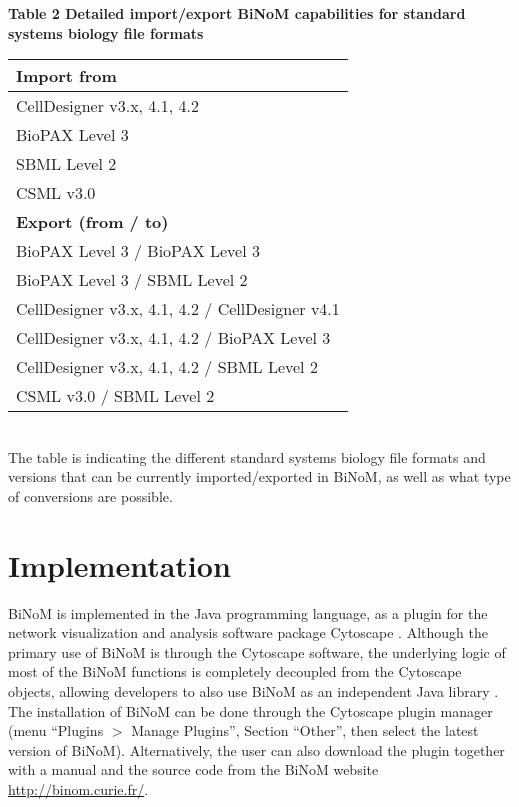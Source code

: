 \documentclass[11pt]{bmc_article_s50}
\newenvironment{bmcformat}{\begin{raggedright}\baselineskip20pt\sloppy\setboolean{publ}{false}}{\end{raggedright}\baselineskip20pt\sloppy}
\begin{document}
\begin{bmcformat}
\begin{sidewaystable}
\end{sidewaystable}


\begin{table}[!h]
  \textbf{Table 2 Detailed import/export BiNoM capabilities for standard systems biology file formats}

      \begin{tabular*}{\textwidth}{@{\extracolsep\fill}l}
        \hline
    \textbf{Import from} \\
    \hline
        CellDesigner v3.x, 4.1, 4.2 \\
        \hline
        BioPAX Level 3  \\
        \hline
        SBML Level 2 \\
        \hline
        CSML v3.0  \\
        \hline
        \textbf{Export (from / to)} \\
        \hline
        BioPAX Level 3 / BioPAX Level 3 \\
        \hline
        BioPAX Level 3 / SBML Level 2 \\
        \hline
        CellDesigner v3.x, 4.1, 4.2 / CellDesigner v4.1 \\
        \hline
        CellDesigner v3.x, 4.1, 4.2 / BioPAX Level 3 \\
        \hline
        CellDesigner v3.x, 4.1, 4.2 / SBML Level 2 \\
        \hline
        CSML v3.0 / SBML Level 2 \\
        \hline
      \end{tabular*}\\
 The table is indicating the different standard systems biology file formats and versions that can be currently imported/exported in BiNoM, as well as what type of conversions are possible.
\end{table}

\section*{Implementation}
BiNoM is implemented in the Java\texttrademark{} programming language, as a plugin
for the network visualization and analysis software package Cytoscape
\cite{cline2007integration}. Although the primary use of BiNoM is through the
Cytoscape software, the underlying logic of most of the BiNoM functions is completely
decoupled from the Cytoscape objects, allowing developers to also use BiNoM as
an independent Java library \cite{zinovyev2008binom}. The installation of BiNoM
can be done through the Cytoscape plugin manager (menu ``Plugins $>$ Manage
Plugins'', Section ``Other'', then select the latest version of BiNoM). Alternatively, the user can
also download the plugin together with a manual and the source code from the
BiNoM website \url{http://binom.curie.fr/}.


\end{bmcformat}
\end{document}
